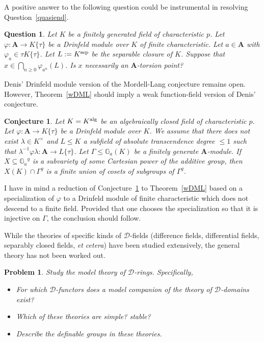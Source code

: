\documentclass{amsart}
\newcommand{\Ga}{{{\mathbb G}_a}}
\newcommand{\cD}{{\mathcal D}}
\newcommand{\alg}{{\rm alg}}
\newcommand{\sep}{{\rm sep}}
\newtheorem{conj}[thm]{Conjecture}
\newtheorem{problem}[thm]{Problem}
\newtheorem{question}[thm]{Question}
\theoremstyle{definition}
\theoremstyle{remark}
\begin{document}
A positive answer to the following question could be 
instrumental in resolving Question~\ref{quasiend}.

\begin{question}
Let $K$ be a finitely generated field of characteristic $p$.
Let $\varphi:{\mathbf A} \to K \{ \tau \}$ be a Drinfeld
module over $K$ of finite characteristic.  Let $a \in {\mathbf A}$
with $\varphi_a \in \tau K \{ \tau \}$.  Let $L := K^\sep$ be the 
separable closure of $K$.  Suppose that $x \in \bigcap_{n \geq 0} \varphi_{a^n}(L)$.
Is $x$ necessarily an ${\mathbf A}$-torsion point?
\end{question}

Denis' Drinfeld module version of the Mordell-Lang conjecture remains open.
However, Theorem~\ref{wDML} should imply a weak function-field version of 
Denis' conjecture.

\begin{conj}
\label{ffDML}
Let $K = K^\alg$ be an algebraically closed field of characteristic $p$.
Let $\varphi:{\mathbf A} \to K \{ \tau \}$ be a Drinfeld module over $K$.
We assume that there does not exist $\lambda \in K^\times$ and $L \leq K$ 
a subfield of absolute transcendence degree $\leq 1$ such that 
$\lambda^{-1} \varphi \lambda: {\mathbf A} \to L \{ \tau \}$.  Let 
$\Gamma \leq \Ga(K)$ be a finitely generate ${\mathbf A}$-module.  
If $X \subseteq \Ga^g$ is a subvariety of some Cartesian power of the 
additive group, then $X(K) \cap \Gamma^g$ is a finite union of cosets of 
subgroups of $\Gamma^g$.
\end{conj} 

I have in mind a reduction of Conjecture~\ref{ffDML} to Theorem~\ref{wDML} based 
on a specialization of $\varphi$ to a Drinfeld module of finite characteristic which 
does not descend to a finite field.  Provided that one chooses the specialization so that
it is injective on $\Gamma$, the conclusion should follow.



While the theories of specific kinds of $\cD$-fields (difference fields, differential fields, separably closed 
fields, \emph{et cetera}) have been studied extensively, the general theory has not been worked out.  

\begin{problem}
Study the model theory of $\cD$-rings.  Specifically, 
\begin{itemize}
\item For which $\cD$-functors does a model companion of the theory of 
$\cD$-domains exist?
\item Which of these theories are simple? stable?
\item Describe the definable groups in these theories.
\end{itemize}
\end{problem}
\end{document}

